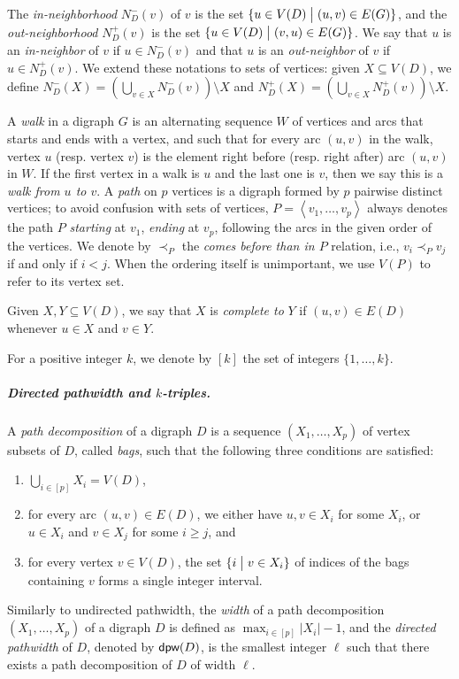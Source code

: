 \documentclass[a4paper,UKenglish,cleveref, autoref, thm-restate]{lipics-v2021}
\DeclareMathOperator{\dpw}{\text{\sf dpw}\xspace}
\renewcommand{\mid}{\bigm|}
\newcommand{\angled}[1]{\left\langle{#1}\right\rangle}
\begin{document}
The \emph{in-neighborhood} $N^-_D(v)$ of $v$ is the set $\{u \in V(D) \mid (u,v) \in
E(G)\}$, and the \emph{out-neighborhood} $N^+_D(v)$ is the set $\{u \in V(D) \mid (v,u)
\in E(G)\}$.
We say that $u$ is an \emph{in-neighbor} of $v$ if $u \in N^-_D(v)$ and that $u$ is an
\emph{out-neighbor} of $v$ if $u \in N^+_D(v)$.
We extend these notations to sets of vertices: given $X \subseteq V(D)$, we define
$N^-_D(X) = (\bigcup_{v \in X}N^-_D(v)) \setminus X$ and $N^+_D(X) = (\bigcup_{v \in
X}N^+_D(v)) \setminus X$.

A \emph{walk} in a digraph $G$ is an alternating sequence $W$ of vertices and arcs that
starts and ends with a vertex, and such that for every arc $(u,v)$ in the walk, vertex
$u$ (resp. vertex $v$) is the element right before (resp. right after) arc $(u,v)$ in $W$.
If the first vertex in a walk is $u$ and the last one is $v$, then we say this is a
\emph{walk from $u$ to $v$}.
A \emph{path} on $p$ vertices is a digraph formed by $p$ pairwise distinct vertices; to avoid confusion with sets of vertices, $P = \angled{v_1, \dots, v_p}$ always denotes the path $P$ \emph{starting} at $v_1$, \emph{ending} at $v_p$, following the arcs in the given order of the vertices. We denote by $\prec_P$ the \emph{comes before than in $P$} relation, i.e., $v_i \prec_P v_j$ if and only if $i < j$.
When the ordering itself is unimportant, we use $V(P)$ to refer to its vertex set.

Given $X,Y \subseteq V(D)$, we say that $X$ is \emph{complete to} $Y$ if $(u,v) \in E(D)$ whenever $u \in X$ and $v \in Y$.

For a positive integer $k$, we denote by $[k]$ the set of integers $\{1, \ldots, k\}$.

\subparagraph*{Directed pathwidth and $k$-triples.} A \textit{path decomposition} of a digraph $D$ is
a sequence $(X_1, \ldots , X_p)$ of vertex subsets of $D$, called \textit{bags}, such that the
following three conditions are satisfied:
\begin{enumerate}
    \item $\bigcup_{i \in [p]}X_i = V(D)$,
    \item for every arc $(u, v)\in E(D)$, we either have $u,v \in X_i$ for some $X_i$, or $u \in  X_i$ and $v \in X_j$ for some $i \geq j$, and
\item for every vertex $v \in V (D)$, the set $\{i \mid v \in X_i\}$ of indices of the bags containing $v$ forms a single integer interval.    
\end{enumerate}
Similarly to undirected pathwidth, the \textit{width} of a path decomposition $(X_1, \ldots , X_p)$  of a digraph $D$ is defined as $\max_{i \in [p]}|X_i|-1$, and the \textit{directed pathwidth} of $D$, denoted by $\dpw(D)$, is the smallest integer $\ell$ such that there exists a path decomposition of $D$ of width $\ell$. 
\end{document}
